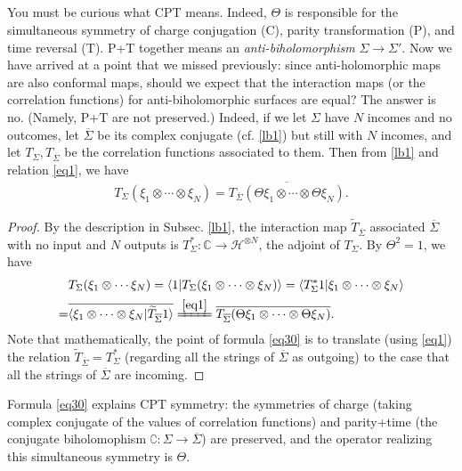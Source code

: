 \documentclass[12pt,a4paper,notitlepage]{article}
\theoremstyle{definition}
\theoremstyle{plain}
\newcommand{\mc}{\mathcal}
\newcommand{\wtd}{\widetilde}
\newcommand{\ovl}{\overline}
\newcommand{\bk}[1]{\langle {#1}\rangle}
\newcommand{\Co}{\complement}
\newcommand{\Cbb}{\mathbb C}
\numberwithin{equation}{section}
\begin{document}
\subsection{}

You must be curious what CPT means. Indeed, $\Theta$ is responsible for the simultaneous symmetry of charge conjugation (C), parity transformation (P), and time reversal (T). P+T together means  an \emph{anti-biholomorphism} $\Sigma\rightarrow\Sigma'$. Now we have arrived at a point that we missed previously: since anti-holomorphic maps are also conformal maps, should we expect that the interaction maps (or the correlation functions) for   anti-biholomorphic surfaces are equal? The answer is no. (Namely, P+T are not preserved.) Indeed, if we let $\Sigma$ have $N$ incomes and no outcomes, let $\ovl\Sigma$ be its complex conjugate (cf. \ref{lb1}) but still with $N$ incomes, and let $T_\Sigma,T_{\ovl\Sigma}$ be the correlation functions associated to them. Then from \ref{lb1} and relation \eqref{eq1}, we have 
\begin{align}
T_\Sigma(\xi_1\otimes\cdots\otimes\xi_N)=\ovl{T_{\ovl\Sigma}(\Theta\xi_1\otimes\cdots\otimes\Theta\xi_N)}.\label{eq30}	
\end{align}

\begin{proof}
By the description in Subsec. \ref{lb1}, the interaction map $\wtd T_{\ovl\Sigma}$ associated $\ovl\Sigma$ with no input and $N$ outputs is $T_\Sigma^*:\Cbb\rightarrow\mc H^{\otimes N}$, the adjoint of $T_\Sigma$. By  $\Theta^2=1$, we have
\begin{align*}
&T_\Sigma(\xi_1\otimes\cdots\xi_N)=\bk{1|T_\Sigma(\xi_1\otimes\cdots\otimes\xi_N)}=\bk{T_\Sigma^*1|\xi_1\otimes\cdots\otimes\xi_N}\\
=&\ovl{\bk{\xi_1\otimes\cdots\otimes \xi_N|\wtd T_{\ovl\Sigma}1}}\xlongequal{\eqref{eq1}}\ovl{T_{\ovl\Sigma}(\Theta\xi_1\otimes\cdots\otimes\Theta\xi_N)}.	
\end{align*}
Note that mathematically, the point of formula \eqref{eq30} is to translate (using \eqref{eq1}) the relation $\wtd T_{\ovl\Sigma}=T_\Sigma^*$ (regarding all the strings of $\ovl\Sigma$ as outgoing) to the case that all the strings of $\ovl\Sigma$ are incoming. 
\end{proof}
Formula \eqref{eq30} explains CPT symmetry: the symmetries of charge (taking complex conjugate of the values of correlation functions) and parity+time (the conjugate biholomophism $\Co:\Sigma\rightarrow\ovl\Sigma$) are preserved, and the operator realizing this simultaneous symmetry is $\Theta$.
\end{document}
